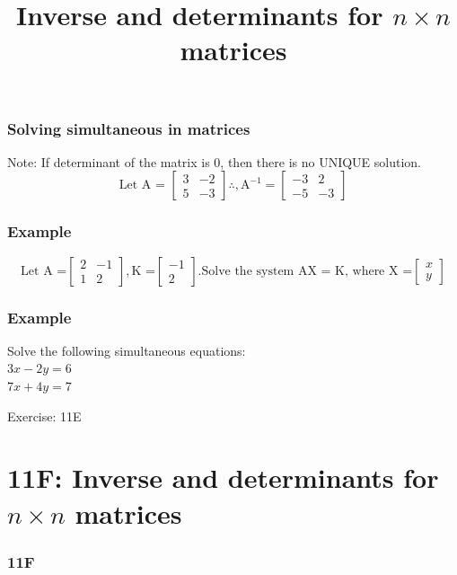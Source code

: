 \documentclass[
	11pt, %
]{beamer}
\begin{document}
\begin{frame}[t]
    \frametitle{Solving simultaneous in matrices}
    Note: If determinant of the matrix is 0, then there is no UNIQUE solution.
    \[
        \text{Let A = }
        \begin{bmatrix}
            3 & -2\\
            5 & -3
        \end{bmatrix}
        \therefore, \text{A}^{-1} =
        \begin{bmatrix}
            -3 & 2\\
            -5 & -3
        \end{bmatrix}
    \]
\end{frame}

\begin{frame}[t]
    \frametitle{Example}
    \[
        \text{Let A =}
        \begin{bmatrix}
            2 & -1\\
            1 & 2
        \end{bmatrix},
        \text{K =}
        \begin{bmatrix}
            -1\\
            2
        \end{bmatrix}
        . \text{Solve the system AX = K, where X =}
        \begin{bmatrix}
            x\\
            y
        \end{bmatrix}
    \]
\end{frame}

\begin{frame}[t]
    \frametitle{Example}
    Solve the following simultaneous equations:\\
    $3x - 2y = 6$\\
    $7x + 4y = 7$
\end{frame}
\begin{frame}{Exercise: 11E}
\end{frame}
\section{11F: Inverse and determinants for $n \times n$ matrices}
\begin{frame}
    \frametitle{11F}
    \begin{center}
        \title{Inverse and determinants for $n \times n$ matrices}
        \maketitle
    \end{center}
\end{frame}
\end{document}
